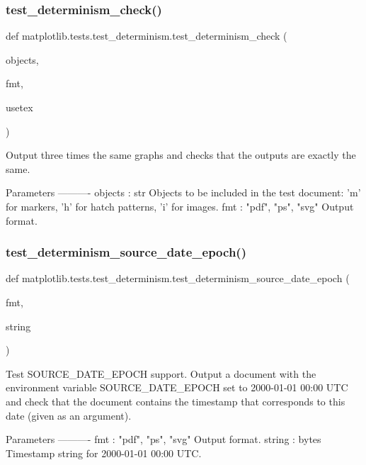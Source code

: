 \subsubsection{\texorpdfstring{test\+\_\+determinism\+\_\+check()}{test\_determinism\_check()}}
{\footnotesize\ttfamily def matplotlib.\+tests.\+test\+\_\+determinism.\+test\+\_\+determinism\+\_\+check (\begin{DoxyParamCaption}\item[{}]{objects,  }\item[{}]{fmt,  }\item[{}]{usetex }\end{DoxyParamCaption})}

\begin{DoxyVerb}Output three times the same graphs and checks that the outputs are exactly
the same.

Parameters
----------
objects : str
    Objects to be included in the test document: 'm' for markers, 'h' for
    hatch patterns, 'i' for images.
fmt : {"pdf", "ps", "svg"}
    Output format.
\end{DoxyVerb}
 \mbox{\label{namespacematplotlib_1_1tests_1_1test__determinism_a43452efa2aa142d4fc977f9f112ec4ec}} 
\subsubsection{\texorpdfstring{test\+\_\+determinism\+\_\+source\+\_\+date\+\_\+epoch()}{test\_determinism\_source\_date\_epoch()}}
{\footnotesize\ttfamily def matplotlib.\+tests.\+test\+\_\+determinism.\+test\+\_\+determinism\+\_\+source\+\_\+date\+\_\+epoch (\begin{DoxyParamCaption}\item[{}]{fmt,  }\item[{}]{string }\end{DoxyParamCaption})}

\begin{DoxyVerb}Test SOURCE_DATE_EPOCH support. Output a document with the environment
variable SOURCE_DATE_EPOCH set to 2000-01-01 00:00 UTC and check that the
document contains the timestamp that corresponds to this date (given as an
argument).

Parameters
----------
fmt : {"pdf", "ps", "svg"}
    Output format.
string : bytes
    Timestamp string for 2000-01-01 00:00 UTC.
\end{DoxyVerb}
 

